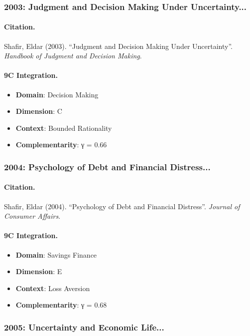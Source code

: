 \subsubsection{2003: Judgment and Decision Making Under Uncertainty...}

\paragraph{Citation.}
Shafir, Eldar (2003). ``Judgment and Decision Making Under Uncertainty''. \textit{Handbook of Judgment and Decision Making}.

\paragraph{9C Integration.}
\begin{itemize}[nosep]
  \item \textbf{Domain}: Decision Making
  \item \textbf{Dimension}: C
  \item \textbf{Context}: Bounded Rationality
  \item \textbf{Complementarity}: γ = 0.66
\end{itemize}


\subsubsection{2004: Psychology of Debt and Financial Distress...}

\paragraph{Citation.}
Shafir, Eldar (2004). ``Psychology of Debt and Financial Distress''. \textit{Journal of Consumer Affairs}.

\paragraph{9C Integration.}
\begin{itemize}[nosep]
  \item \textbf{Domain}: Savings Finance
  \item \textbf{Dimension}: E
  \item \textbf{Context}: Loss Aversion
  \item \textbf{Complementarity}: γ = 0.68
\end{itemize}


\subsubsection{2005: Uncertainty and Economic Life...}

